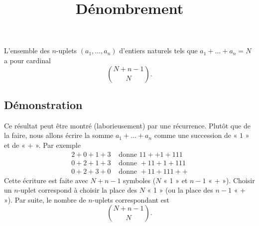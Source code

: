 \documentclass[fontsize=12pt,twoside=false,parskip=half, french]{scrartcl}
\title{Dénombrement}
\date{}
\author{}
\begin{document}
\maketitle
   \begin{Theoreme}
      L’ensemble des $n$-uplets $(a_1, \ldots, a_n)$ d’entiers naturels tels que $a_1 + \ldots + a_n = N$ a pour cardinal
      \[
         \binom{N + n - 1}{N}.
      \]
   \end{Theoreme}
   \subsection{Démonstration}
      Ce résultat peut être montré (laborieusement) par une récurrence. Plutôt que de la faire, nous allons écrire la
      somme $a_1 + \ldots + a_n$ comme une succession de « $1$ » et de « $+$ ». Par exemple
      \begin{align*}
         2 + 0 + 1 + 3 &\text{ donne } 11 + + 1 + 111\\ 
         0 + 2 + 1 + 3 &\text{ donne } + 11 + 1 + 111\\ 
         0 + 2 + 3 + 0 &\text{ donne } + 11 + 111 + +        
      \end{align*}
      Cette écriture est faite avec $N + n - 1$ symboles ($N$ « 1 » et $n - 1$ « + »). Choisir un $n$-uplet 
      correspond à choisir la place des $N$ « 1 » (ou la place des $n - 1$ « + »). Par suite, le nombre de 
      $n$-uplets correspondant est
      \[
         \binom{N + n - 1}{N}.
      \]
\end{document}
